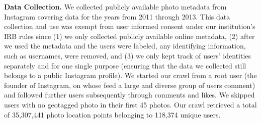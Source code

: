 \textbf{Data Collection.} 
We collected publicly available photo metadata from Instagram covering data for the years from 2011 through 2013. 
This data collection and use was exempt from user informed consent under our institution's IRB rules since (1) we only collected publicly available online metadata, (2) after we used the metadata and the users were labeled, any identifying information, such as usernames, were removed, and (3) we only kept track of users' identities separately and for one single purpose (ensuring that the data we collected still belongs to a public Instagram  profile). 
We started our crawl from a root user (the founder of Instagram, on whose feed a large and diverse group of users comment) and followed further users subsequently through comments and likes. 
We skipped users with no geotagged photo in their first 45 photos. 
Our crawl retrieved a total of 35,307,441 photo location points belonging to 118,374 unique users.

